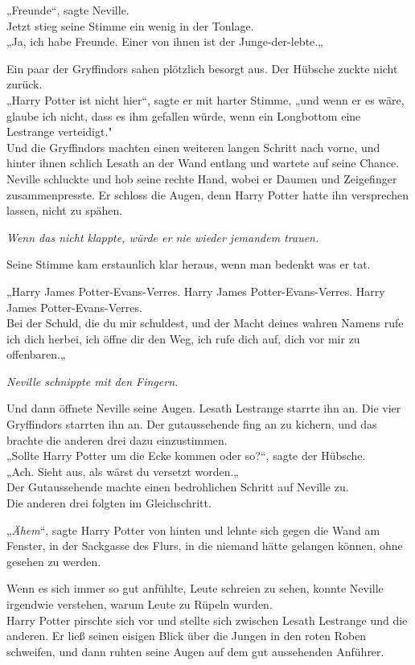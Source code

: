 {„Freunde“, sagte Neville.\\ Jetzt stieg seine Stimme ein wenig in der Tonlage.\\ „Ja, ich habe Freunde. Einer von ihnen ist der Junge-der-lebte.„

Ein paar der Gryffindors sahen plötzlich besorgt aus. Der Hübsche zuckte nicht zurück.\\ „Harry Potter ist nicht hier“, sagte er mit harter Stimme, „und wenn er es wäre, glaube ich nicht, dass es ihm gefallen würde, wenn ein Longbottom eine Lestrange verteidigt."\\ Und die Gryffindors machten einen weiteren langen Schritt nach vorne, und hinter ihnen schlich Lesath an der Wand entlang und wartete auf seine Chance.\\ Neville schluckte und hob seine rechte Hand, wobei er Daumen und Zeigefinger zusammenpresste. Er schloss die Augen, denn Harry Potter hatte ihn versprechen lassen, nicht zu spähen.

\emph{Wenn das nicht klappte, würde er nie wieder jemandem trauen.}

Seine Stimme kam erstaunlich klar heraus, wenn man bedenkt was er tat.

„Harry James Potter-Evans-Verres. Harry James Potter-Evans-Verres. Harry James Potter-Evans-Verres.\\ Bei der Schuld, die du mir schuldest, und der Macht deines wahren Namens rufe ich dich herbei, ich öffne dir den Weg, ich rufe dich auf, dich vor mir zu offenbaren.„

\emph{Neville schnippte mit den Fingern.}

Und dann öffnete Neville seine Augen. Lesath Lestrange starrte ihn an. Die vier Gryffindors starrten ihn an. Der gutaussehende fing an zu kichern, und das brachte die anderen drei dazu einzustimmen.\\ „Sollte Harry Potter um die Ecke kommen oder so?“, sagte der Hübsche.\\ „Ach. Sieht aus, als wärst du versetzt worden.„\\ Der Gutaussehende machte einen bedrohlichen Schritt auf Neville zu.\\ Die anderen drei folgten im Gleichschritt.

„\emph{Ähem}“, sagte Harry Potter von hinten und lehnte sich gegen die Wand am Fenster, in der Sackgasse des Flurs, in die niemand hätte gelangen können, ohne gesehen zu werden.

Wenn es sich immer so gut anfühlte, Leute schreien zu sehen, konnte Neville irgendwie verstehen, warum Leute zu Rüpeln wurden.\\ Harry Potter pirschte sich vor und stellte sich zwischen Lesath Lestrange und die anderen. Er ließ seinen eisigen Blick über die Jungen in den roten Roben schweifen, und dann ruhten seine Augen auf dem gut aussehenden Anführer.

}
